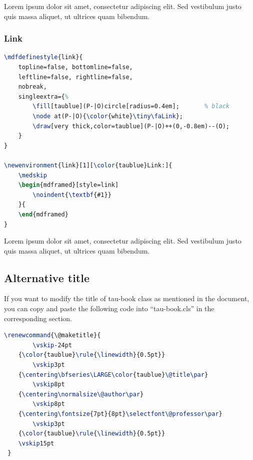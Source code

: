 \documentclass[10pt,a4paper,twoside]{tau-book}
\begin{document}
			\begin{warn}
				Lorem ipsum dolor sit amet, consectetur adipiscing elit. Sed vestibulum justo quis massa aliquet, ut ultrices quam bibendum.
			\end{warn}
			
		\subsubsection{Link}
		
			\begin{lstlisting}[language=TeX, caption=Link environment code.]
\mdfdefinestyle{link}{
	topline=false, bottomline=false,
	leftline=false, rightline=false,
	nobreak,
	singleextra={%
		\fill[taublue](P-|O)circle[radius=0.4em];		% black
		\node at(P-|O){\color{white}\tiny\faLink};
		\draw[very thick,color=taublue](P-|O)++(0,-0.8em)--(O);
	}
}

\newenvironment{link}[1][\color{taublue}Link:]{
	\medskip
	\begin{mdframed}[style=link]
		\noindent{\textbf{#1}}
	}{
	\end{mdframed}
} \end{lstlisting}
			
			\begin{link}
				Lorem ipsum dolor sit amet, consectetur adipiscing elit. Sed vestibulum justo quis massa aliquet, ut ultrices quam bibendum.
			\end{link}
			
	\subsection{Alternative title}
	
            If you want to modify the title of tau-book class as mentioned in the document, you can copy and paste the following code into ``tau-book.cls'' in the corresponding section.
	
		\begin{lstlisting}[language=TeX, caption=Alternative title.]
\renewcommand{\@maketitle}{
		\vskip-24pt
	{\color{taublue}\rule{\linewidth}{0.5pt}}
		\vskip3pt
	{\centering\bfseries\LARGE\color{taublue}\@title\par}
		\vskip8pt
	{\centering\normalsize\@author\par}
		\vskip8pt
	{\centering\fontsize{7pt}{8pt}\selectfont\@professor\par}
		\vskip3pt
	{\color{taublue}\rule{\linewidth}{0.5pt}}
	\vskip15pt
 } \end{lstlisting}
		
\end{document}

